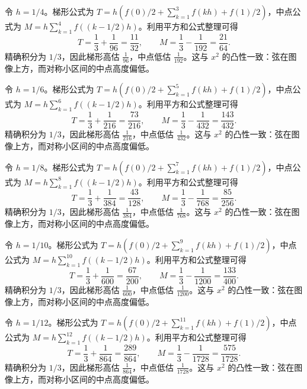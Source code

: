 \documentclass[12pt,fontset=fandol]{ctexart}
\begin{document}
\begin{solve}\label{ans:c18q2}
令 $h=1/4$。梯形公式为 $T=h(f(0)/2+\sum_{k=1}^{3}f(kh)+f(1)/2)$，中点公式为 $M=h\sum_{k=1}^{4}f((k-1/2)h)$。利用平方和公式整理可得
\[
T=\frac13+\frac1{96}=\frac{11}{32},\qquad M=\frac13-\frac1{192}=\frac{21}{64}.
\]
精确积分为 $1/3$，因此梯形高估 $\frac{1}{96}$，中点低估 $\frac{1}{192}$。这与 $x^2$ 的凸性一致：弦在图像上方，而对称小区间的中点高度偏低。
\end{solve}

\begin{solve}\label{ans:c18q3}
令 $h=1/6$。梯形公式为 $T=h(f(0)/2+\sum_{k=1}^{5}f(kh)+f(1)/2)$，中点公式为 $M=h\sum_{k=1}^{6}f((k-1/2)h)$。利用平方和公式整理可得
\[
T=\frac13+\frac1{216}=\frac{73}{216},\qquad M=\frac13-\frac1{432}=\frac{143}{432}.
\]
精确积分为 $1/3$，因此梯形高估 $\frac{1}{216}$，中点低估 $\frac{1}{432}$。这与 $x^2$ 的凸性一致：弦在图像上方，而对称小区间的中点高度偏低。
\end{solve}

\begin{solve}\label{ans:c18q4}
令 $h=1/8$。梯形公式为 $T=h(f(0)/2+\sum_{k=1}^{7}f(kh)+f(1)/2)$，中点公式为 $M=h\sum_{k=1}^{8}f((k-1/2)h)$。利用平方和公式整理可得
\[
T=\frac13+\frac1{384}=\frac{43}{128},\qquad M=\frac13-\frac1{768}=\frac{85}{256}.
\]
精确积分为 $1/3$，因此梯形高估 $\frac{1}{384}$，中点低估 $\frac{1}{768}$。这与 $x^2$ 的凸性一致：弦在图像上方，而对称小区间的中点高度偏低。
\end{solve}

\begin{solve}\label{ans:c18q5}
令 $h=1/10$。梯形公式为 $T=h(f(0)/2+\sum_{k=1}^{9}f(kh)+f(1)/2)$，中点公式为 $M=h\sum_{k=1}^{10}f((k-1/2)h)$。利用平方和公式整理可得
\[
T=\frac13+\frac1{600}=\frac{67}{200},\qquad M=\frac13-\frac1{1200}=\frac{133}{400}.
\]
精确积分为 $1/3$，因此梯形高估 $\frac{1}{600}$，中点低估 $\frac{1}{1200}$。这与 $x^2$ 的凸性一致：弦在图像上方，而对称小区间的中点高度偏低。
\end{solve}

\begin{solve}\label{ans:c18q6}
令 $h=1/12$。梯形公式为 $T=h(f(0)/2+\sum_{k=1}^{11}f(kh)+f(1)/2)$，中点公式为 $M=h\sum_{k=1}^{12}f((k-1/2)h)$。利用平方和公式整理可得
\[
T=\frac13+\frac1{864}=\frac{289}{864},\qquad M=\frac13-\frac1{1728}=\frac{575}{1728}.
\]
精确积分为 $1/3$，因此梯形高估 $\frac{1}{864}$，中点低估 $\frac{1}{1728}$。这与 $x^2$ 的凸性一致：弦在图像上方，而对称小区间的中点高度偏低。
\end{solve}
\end{document}
